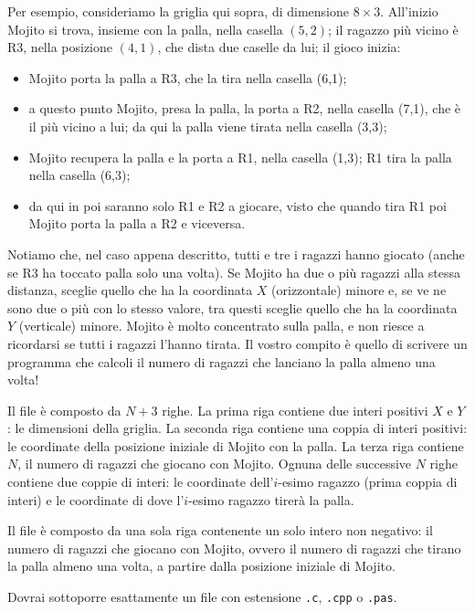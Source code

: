 Per esempio, consideriamo la griglia qui sopra, di dimensione $8 \times 3$. All’inizio Mojito si trova, insieme con la palla, nella casella $(5,2)$; il ragazzo più vicino è R3, nella posizione $(4,1)$, che dista due caselle da lui; il gioco inizia:
\begin{itemize}
\item Mojito porta la palla a R3, che la tira nella casella (6,1); 
\item a questo punto Mojito, presa la palla, la porta a R2, nella casella (7,1), che è il più vicino a lui; da qui la palla viene tirata nella casella (3,3); 
\item Mojito recupera la palla e la porta a R1, nella  casella (1,3); R1 tira la palla nella casella (6,3); 
\item da qui in poi saranno solo R1 e R2 a giocare, visto che quando tira R1 poi Mojito porta la palla a R2 e viceversa.
\end{itemize}

Notiamo che, nel caso appena descritto, tutti e tre i ragazzi hanno giocato (anche se R3 ha toccato palla solo una volta). Se Mojito ha due o più ragazzi alla stessa distanza, sceglie quello che ha la coordinata $X$ (orizzontale) minore e, se ve ne sono due o più con lo stesso valore, tra questi sceglie quello che ha la coordinata $Y$ (verticale) minore. Mojito è molto concentrato sulla palla, e non riesce a ricordarsi se tutti i ragazzi l’hanno tirata. Il vostro compito è quello di scrivere un programma che calcoli il numero di ragazzi che lanciano la palla almeno una volta!

\InputFile
Il file  è composto da $N+3$ righe. La prima riga contiene due interi positivi $X$ e $Y$: le dimensioni della griglia. La seconda riga contiene una coppia di interi positivi: le coordinate della posizione iniziale di Mojito con la palla. La terza riga contiene $N$, il numero di ragazzi che giocano con Mojito. Ognuna delle successive $N$ righe contiene due coppie di interi: le coordinate dell’$i$-esimo ragazzo (prima coppia di interi) e le coordinate di dove l’$i$-esimo ragazzo tirerà la palla.

\OutputFile
Il file \outputfile{} è composto da una sola riga contenente un solo intero non negativo: il numero di ragazzi che giocano con Mojito, ovvero il numero di ragazzi che tirano la palla almeno una volta, a partire dalla posizione iniziale di Mojito.

\Implementation
Dovrai sottoporre esattamente un file con estensione \texttt{.c}, \texttt{.cpp} o \texttt{.pas}.

